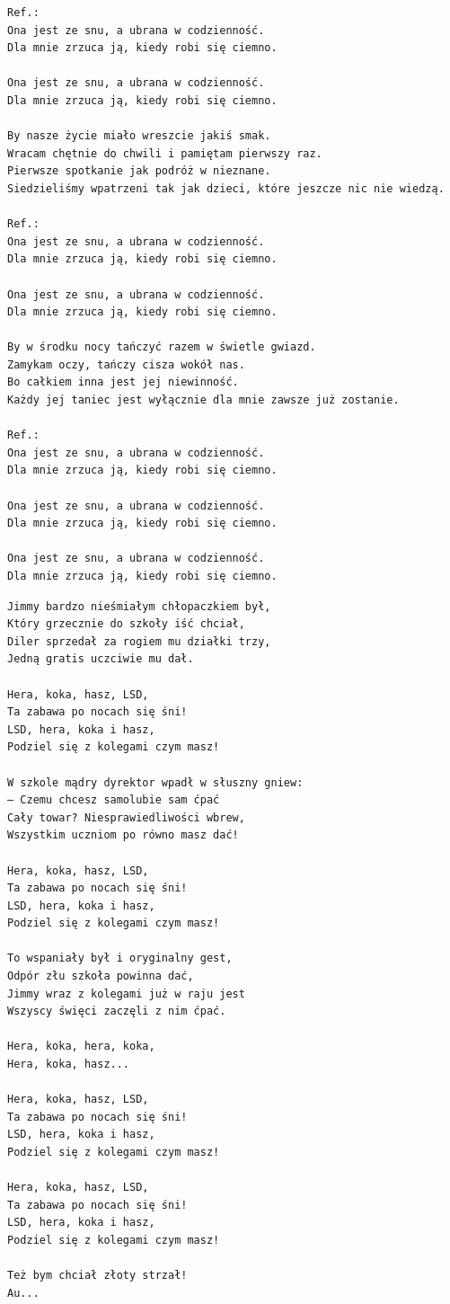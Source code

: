\documentclass[12pt]{article}
\begin{document}
\begin{verbatim}
Ref.:
Ona jest ze snu, a ubrana w codzienność.
Dla mnie zrzuca ją, kiedy robi się ciemno.

Ona jest ze snu, a ubrana w codzienność.
Dla mnie zrzuca ją, kiedy robi się ciemno.

By nasze życie miało wreszcie jakiś smak.
Wracam chętnie do chwili i pamiętam pierwszy raz.
Pierwsze spotkanie jak podróż w nieznane.
Siedzieliśmy wpatrzeni tak jak dzieci, które jeszcze nic nie wiedzą.

Ref.:
Ona jest ze snu, a ubrana w codzienność.
Dla mnie zrzuca ją, kiedy robi się ciemno.

Ona jest ze snu, a ubrana w codzienność.
Dla mnie zrzuca ją, kiedy robi się ciemno.

By w środku nocy tańczyć razem w świetle gwiazd.
Zamykam oczy, tańczy cisza wokół nas.
Bo całkiem inna jest jej niewinność.
Każdy jej taniec jest wyłącznie dla mnie zawsze już zostanie.

Ref.:
Ona jest ze snu, a ubrana w codzienność.
Dla mnie zrzuca ją, kiedy robi się ciemno.

Ona jest ze snu, a ubrana w codzienność.
Dla mnie zrzuca ją, kiedy robi się ciemno.

Ona jest ze snu, a ubrana w codzienność.
Dla mnie zrzuca ją, kiedy robi się ciemno.
\end{verbatim}
\clearpage

\begin{verbatim}
Jimmy bardzo nieśmiałym chłopaczkiem był,
Który grzecznie do szkoły iść chciał,
Diler sprzedał za rogiem mu działki trzy,
Jedną gratis uczciwie mu dał.

Hera, koka, hasz, LSD,
Ta zabawa po nocach się śni!
LSD, hera, koka i hasz,
Podziel się z kolegami czym masz!

W szkole mądry dyrektor wpadł w słuszny gniew:
– Czemu chcesz samolubie sam ćpać
Cały towar? Niesprawiedliwości wbrew,
Wszystkim uczniom po równo masz dać!

Hera, koka, hasz, LSD,
Ta zabawa po nocach się śni!
LSD, hera, koka i hasz,
Podziel się z kolegami czym masz!

To wspaniały był i oryginalny gest,
Odpór złu szkoła powinna dać,
Jimmy wraz z kolegami już w raju jest
Wszyscy święci zaczęli z nim ćpać.

Hera, koka, hera, koka,
Hera, koka, hasz...

Hera, koka, hasz, LSD,
Ta zabawa po nocach się śni!
LSD, hera, koka i hasz,
Podziel się z kolegami czym masz!

Hera, koka, hasz, LSD,
Ta zabawa po nocach się śni!
LSD, hera, koka i hasz,
Podziel się z kolegami czym masz!

Też bym chciał złoty strzał!
Au...
\end{verbatim}
\clearpage
\end{document}
